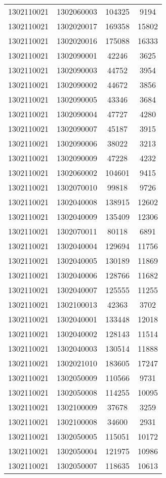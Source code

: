 \begin{longtable}{llcc}
1302110021 & 1302060003 & 104325 & 9194\\
1302110021 & 1302020017 & 169358 & 15802\\
1302110021 & 1302020016 & 175088 & 16333\\
1302110021 & 1302090001 & 42246 & 3625\\
1302110021 & 1302090003 & 44752 & 3954\\
1302110021 & 1302090002 & 44672 & 3856\\
1302110021 & 1302090005 & 43346 & 3684\\
1302110021 & 1302090004 & 47727 & 4280\\
1302110021 & 1302090007 & 45187 & 3915\\
1302110021 & 1302090006 & 38022 & 3213\\
1302110021 & 1302090009 & 47228 & 4232\\
1302110021 & 1302060002 & 104601 & 9415\\
1302110021 & 1302070010 & 99818 & 9726\\
1302110021 & 1302040008 & 138915 & 12602\\
1302110021 & 1302040009 & 135409 & 12306\\
1302110021 & 1302070011 & 80118 & 6891\\
1302110021 & 1302040004 & 129694 & 11756\\
1302110021 & 1302040005 & 130189 & 11869\\
1302110021 & 1302040006 & 128766 & 11682\\
1302110021 & 1302040007 & 125555 & 11255\\
1302110021 & 1302100013 & 42363 & 3702\\
1302110021 & 1302040001 & 133448 & 12018\\
1302110021 & 1302040002 & 128143 & 11514\\
1302110021 & 1302040003 & 130514 & 11888\\
1302110021 & 1302021010 & 183605 & 17247\\
1302110021 & 1302050009 & 110566 & 9731\\
1302110021 & 1302050008 & 114255 & 10095\\
1302110021 & 1302100009 & 37678 & 3259\\
1302110021 & 1302100008 & 34600 & 2931\\
1302110021 & 1302050005 & 115051 & 10172\\
1302110021 & 1302050004 & 121975 & 10986\\
1302110021 & 1302050007 & 118635 & 10613\\

\end{longtable}
